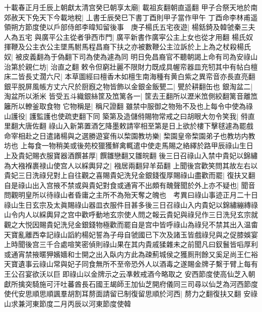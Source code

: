 十載春正月壬辰上朝獻太清宫癸巳朝享太廟|{
	載祖亥翻朝直遥翻}
甲子合祭天地於南郊赦天下免天下今載地稅|{
	丄書壬辰癸巳下書丁酉則甲子當作甲午}
丁酉命李林甫遥領朔方節度使以戶部侍郎李暐知留後事　庚子楊氏五宅夜遊|{
	楊銛錡及韓虢秦三夫人為五宅}
與廣平公主從者爭西市門|{
	廣平新書作廣寜公主上女也從才用翻}
楊氏奴揮鞭及公主衣公主墜馬駙馬程昌裔下扶之亦被數鞭公主泣訴於上上為之杖殺楊氏奴|{
	被皮義翻為于偽翻下司為使為遽為同}
明日免昌裔官不聽朝謁上命有司為安祿山治第於親仁坊|{
	治直之翻}
敕令但窮壯麗不限財力既成具幄帟器皿充牣其中有帖白檀床二皆長丈濶六尺|{
	本草圖經曰檀香木如檀生南海種有黄白紫之異帟音亦長直亮翻}
銀平脱屏風帳方丈六尺於厨廐之物皆飾以金銀金飯甖二|{
	甖於耕翻缶也}
銀淘盆二|{
	淘盆所以淅米}
皆受五斗織銀絲筐及笟篱各一|{
	筐去王翻所以瀝米笟側絞翻篱音離笟籬所以轑釜取食物}
它物稱是|{
	稱尺證翻}
雖禁中服御之物殆不及也上每令中使為祿山護役|{
	護監護也使疏吏翻下同}
築第及造儲偫賜物常戒之曰胡眼大勿令笑我|{
	偫直里翻大唐佐翻}
祿山入新第置酒乞降墨敕請宰相至第是日上欲於樓下擊毬遽為罷戲命宰相赴之日遣諸楊與之選勝遊宴侑以棃園教坊樂|{
	棃園皇帝棃園弟子也教坊内教坊也}
上每食一物稍美或後苑校獵獲鮮禽輒遣中使走馬賜之絡繹於路甲辰祿山生日上及貴妃賜衣服寶器酒饌甚厚|{
	饌雛戀翻又雛皖翻}
後三日召祿山入禁中貴妃以錦繡為大襁褓裹禄山使宫人以綵輿舁之|{
	襁居兩翻舁羊茹翻}
上聞後宫歡笑問其故左右以貴妃三日洗祿兒對上自往觀之喜賜貴妃洗兒金銀錢復厚賜祿山盡歡而罷|{
	復扶又翻}
自是祿山出入宫掖不禁或與貴妃對食或通宵不出頗有醜聲聞於外上亦不疑也|{
	聞音問觀明皇所以待祿山者昏庸之主所不為殆天奪之魄也　考異曰祿山事迹正月二十日祿山生日玄宗及太眞賜祿山器皿衣服件目甚多後三日召祿山入内貴妃以錦繡繃縳祿山令内人以綵輿舁之宫中歡呼動地玄宗使人問之報云貴妃與祿兒作三日洗兒玄宗就觀之大悦因賜貴妃洗兒金銀錢物極歡而罷自是宫中皆呼祿山為祿兒不禁其出入温畬天寶亂離西幸記祿山謟約楊妃誓為子母自虢國已下次及諸玉皆戲祿兒與之促膝娛宴上時聞後宫三千合處喧笑密偵則祿山果在其内貴戚猱雜未之前聞凡曰釵鬟皆㗖厚利或通宵禁掖暱狎嬪嬙和士開之出入臥内方此為疎薊城侯之獲厠刑餘又奚足尚王仁裕天寶遺事云祿山常與妃子同食無所不至帝恐外人以酒毒之遂賜金牌子繫于臂上每有王公召宴欲沃以巨即祿山以金牌示之云凖敕戒酒今略取之}
安西節度使高仙芝入朝獻所擒突騎施可汗吐蕃酋長石國王朅師王加仙芝開府儀同三司尋以仙芝為河西節度使代安思順思順諷羣胡割耳剺面請留已制復留思順於河西|{
	剺力之翻復扶又翻}
安祿山求兼河東節度二月丙辰以河東節度使韓

